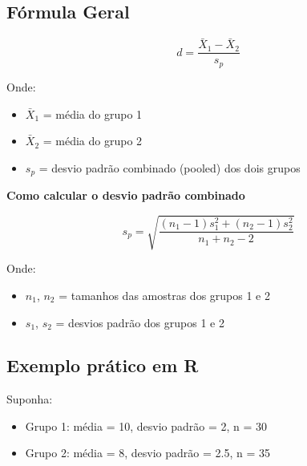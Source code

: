 \documentclass[
]{book}
\providecommand{\tightlist}{%
  \setlength{\itemsep}{0pt}\setlength{\parskip}{0pt}}
\begin{document}
\subsection{Fórmula Geral}\label{fuxf3rmula-geral}

\[
d = \frac{\bar{X}_1 - \bar{X}_2}{s_p}
\]

Onde:

\begin{itemize}
\tightlist
\item
  \(\bar{X}_1\) = média do grupo 1\\
\item
  \(\bar{X}_2\) = média do grupo 2\\
\item
  \(s_p\) = desvio padrão combinado (pooled) dos dois grupos
\end{itemize}

\textbf{Como calcular o desvio padrão combinado}

\[
s_p = \sqrt{ \frac{(n_1-1)s_1^2 + (n_2-1)s_2^2}{n_1 + n_2 - 2} }
\]

Onde:

\begin{itemize}
\tightlist
\item
  \(n_1\), \(n_2\) = tamanhos das amostras dos grupos 1 e 2\\
\item
  \(s_1\), \(s_2\) = desvios padrão dos grupos 1 e 2
\end{itemize}

\subsection{Exemplo prático em R}\label{exemplo-pruxe1tico-em-r}

Suponha:

\begin{itemize}
\tightlist
\item
  Grupo 1: média = 10, desvio padrão = 2, n = 30\\
\item
  Grupo 2: média = 8, desvio padrão = 2.5, n = 35
\end{itemize}
\end{document}
